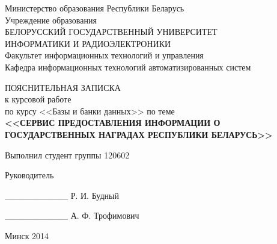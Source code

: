 \begin{titlepage}
\thispagestyle{empty}
\setlength{\parindent}{0ex} %

\begin{center}
  Министерство образования Республики Беларусь \\
  \smallskip
  Учреждение образования \\
  БЕЛОРУССКИЙ ГОСУДАРСТВЕННЫЙ УНИВЕРСИТЕТ \\
  ИНФОРМАТИКИ И РАДИОЭЛЕКТРОНИКИ \\
  \smallskip
  Факультет информационных технологий и управления \\
  \smallskip
  Кафедра информационных технологий автоматизированных систем
\end{center}

\vspace{50mm}

\begin{center}
  ПОЯСНИТЕЛЬНАЯ ЗАПИСКА \\
  к курсовой работе \\
  по курсу <<Базы и банки данных>> по теме\\
  \textbf{<<СЕРВИС ПРЕДОСТАВЛЕНИЯ ИНФОРМАЦИИ О \\
    ГОСУДАРСТВЕННЫХ НАГРАДАХ РЕСПУБЛИКИ БЕЛАРУСЬ>>} \\
\end{center}

\vspace{30mm}

\begin{minipage}{.45\linewidth}
    Выполнил студент группы 120602 

    \smallskip

    Руководитель 
\end{minipage}
\hfill
\begin{minipage}{.5\linewidth}
  \begin{flushright}
    \_\_\_\_\_\_\_\_\_\_ Р. И. Будный

    \smallskip

    \_\_\_\_\_\_\_\_\_\_ А. Ф. Трофимович 
  \end{flushright}
\end{minipage}

\vspace{60mm}
\begin{center}
  Минск 2014
\end{center}

\setlength{\parindent}{5ex} %
\end{titlepage}